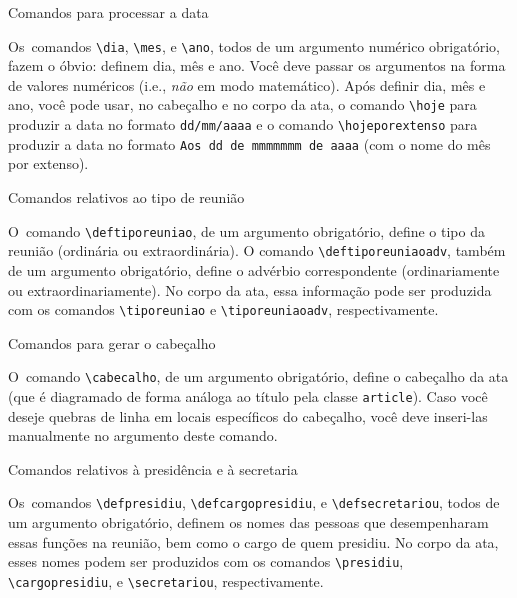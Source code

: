 \documentclass[12pt,a4paper,euler,beton]{ata}
\begin{document}
\begin{ponto}{Comandos para processar a data}

  Os~comandos \verb+\dia+, \verb+\mes+, e \verb+\ano+, todos de um
  argumento numérico obrigatório, fazem o óbvio: definem dia, mês e
  ano. Você deve passar os argumentos na forma de valores numéricos
  (i.e., \emph{não} em modo matemático). Após definir dia, mês e ano,
  você pode usar, no cabeçalho e no corpo da ata, o comando
  \verb+\hoje+ para produzir a data no formato \texttt{dd/mm/aaaa} e o
  comando \verb+\hojeporextenso+ para produzir a data no formato
  \texttt{Aos dd de mmmmmmm de aaaa} (com o nome do mês por extenso).

\end{ponto}


\begin{ponto}{Comandos relativos ao tipo de reunião}

  O~comando \verb+\deftiporeuniao+, de um argumento obrigatório,
  define o tipo da reunião (ordinária ou extraordinária). O comando
  \verb+\deftiporeuniaoadv+, também de um argumento obrigatório,
  define o advérbio correspondente (ordinariamente ou
  extraordinariamente). No corpo da ata, essa informação pode ser
  produzida com os comandos \verb+\tiporeuniao+ e
  \verb+\tiporeuniaoadv+, respectivamente.

\end{ponto}


\begin{ponto}{Comandos para gerar o cabeçalho}

  O~comando \verb+\cabecalho+, de um argumento obrigatório, define o
  cabeçalho da ata (que é diagramado de forma análoga ao título pela
  classe \texttt{article}). Caso você deseje quebras de linha em
  locais específicos do cabeçalho, você deve inseri-las manualmente no
  argumento deste comando.

\end{ponto}


\begin{ponto}{Comandos relativos à presidência e à secretaria}

  Os~comandos \verb+\defpresidiu+, \verb+\defcargopresidiu+, e
  \verb+\defsecretariou+, todos de um argumento obrigatório, definem
  os nomes das pessoas que desempenharam essas funções na reunião, bem
  como o cargo de quem presidiu. No corpo da ata, esses nomes podem
  ser produzidos com os comandos \verb+\presidiu+,
  \verb+\cargopresidiu+, e \verb+\secretariou+, respectivamente.

\end{ponto}
\end{document}
